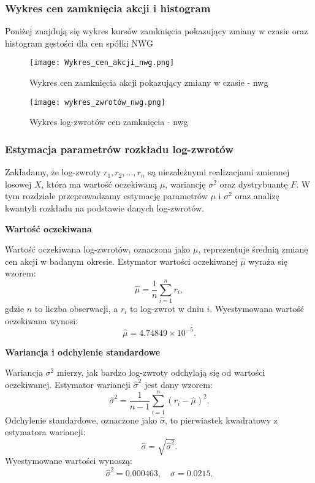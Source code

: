 \documentclass[a4paper,11pt]{article}
\begin{document}
\subsubsection{Wykres cen zamknięcia akcji i histogram}
Poniżej znajdują się wykres kursów zamknięcia pokazujący zmiany w czasie oraz histogram gęstości dla cen spółki NWG

\begin{figure}[h]
\centering
\begin{minipage}[b]{0.40\textwidth}
\centering
\texttt{[image: Wykres\_cen\_akcji\_nwg.png]}
\caption{Wykres cen zamknięcia akcji pokazujący zmiany w czasie - nwg}
\label{fig:r3}
\end{minipage}
\hfill
\begin{minipage}[b]{0.40\textwidth}
\centering
\texttt{[image: wykres\_zwrotów\_nwg.png]}
\caption{Wykres log-zwrotów cen zamknięcia - nwg}
\label{fig:r4}
\end{minipage}
\end{figure}


\subsubsection{Estymacja parametrów rozkładu log-zwrotów}

Zakładamy, że log-zwroty \(r_1, r_2, \ldots, r_n\) są niezależnymi realizacjami zmiennej losowej \(X\), która ma wartość oczekiwaną \(\mu\), wariancję \(\sigma^2\) oraz dystrybuantę \(F\). W tym rozdziale przeprowadzamy estymację parametrów \(\mu\) i \(\sigma^2\) oraz analizę kwantyli rozkładu na podstawie danych log-zwrotów.

\smallskip
\textbf{Wartość oczekiwana}

Wartość oczekiwana log-zwrotów, oznaczona jako \(\mu\), reprezentuje średnią zmianę cen akcji w badanym okresie. Estymator wartości oczekiwanej \(\hat{\mu}\) wyraża się wzorem:
\[
\hat{\mu} = \frac{1}{n} \sum_{i=1}^{n} r_i,
\]
gdzie \(n\) to liczba obserwacji, a \(r_i\) to log-zwrot w dniu \(i\). Wyestymowana wartość oczekiwana wynosi:  
\[
\hat{\mu} = 4.74849 \times 10^{-5}.
\]

\textbf{Wariancja i odchylenie standardowe}

Wariancja \(\sigma^2\) mierzy, jak bardzo log-zwroty odchylają się od wartości oczekiwanej. Estymator wariancji \(\hat{\sigma}^2\) jest dany wzorem:
\[
\hat{\sigma}^2 = \frac{1}{n-1} \sum_{i=1}^{n} (r_i - \hat{\mu})^2.
\]
Odchylenie standardowe, oznaczone jako \(\hat{\sigma}\), to pierwiastek kwadratowy z estymatora wariancji:
\[
\hat{\sigma} = \sqrt{\hat{\sigma}^2}.
\]
Wyestymowane wartości wynoszą:  
\[
\hat{\sigma}^2 = 0.000463, \quad \hat{\sigma} = 0.0215.
\]
\end{document}
